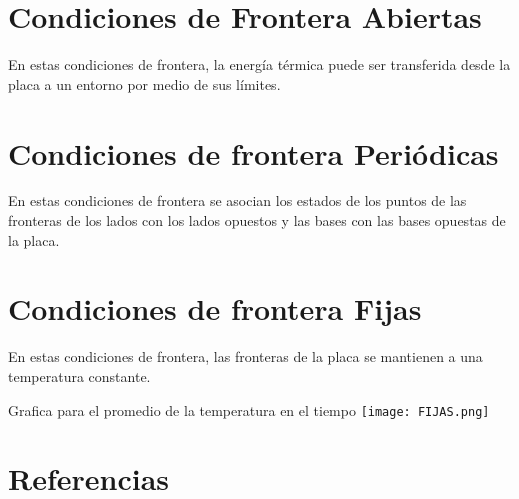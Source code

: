 \documentclass[twoside]{article}
\begin{document}
\section{Condiciones de Frontera Abiertas}

En estas condiciones de frontera, la energía térmica puede ser transferida desde la placa a un entorno por medio de sus límites. 



\section{Condiciones de frontera Periódicas}

En estas condiciones de frontera se asocian los estados de los puntos de las fronteras de los lados con los lados opuestos y las bases con las bases opuestas de la placa. 



\section{Condiciones de frontera Fijas}

En estas condiciones de frontera, las fronteras de la placa se mantienen a una temperatura constante. 

Grafica para el promedio de la temperatura en el tiempo 
\texttt{[image: FIJAS.png]}


\section{Referencias}
\end{document}
